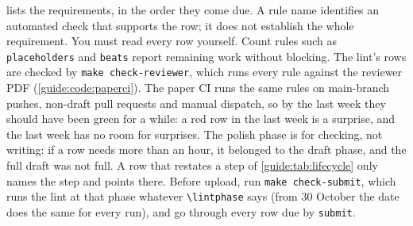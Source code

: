 lists the requirements, in the order they come due. A rule name identifies an automated check that supports the row; it does not establish the whole requirement. You must read every row yourself. Count rules such as \texttt{placeholders} and \texttt{beats} report remaining work without blocking. The lint's rows are checked by \texttt{make check-reviewer}, which runs every rule against the reviewer PDF (\cref{guide:code:paperci}). The paper CI runs the same rules on main-branch pushes, non-draft pull requests and manual dispatch, so by the last week they should have been green for a while: a red row in the last week is a surprise, and the last week has no room for surprises. The polish phase is for checking, not writing: if a row needs more than an hour, it belonged to the draft phase, and the full draft was not full. A row that restates a step of \cref{guide:tab:lifecycle} only names the step and points there. Before upload, run \texttt{make check-submit}, which runs the lint at that phase whatever \texttt{\textbackslash lintphase} says (from 30 October the date does the same for every run), and go through every row due by \texttt{submit}.

